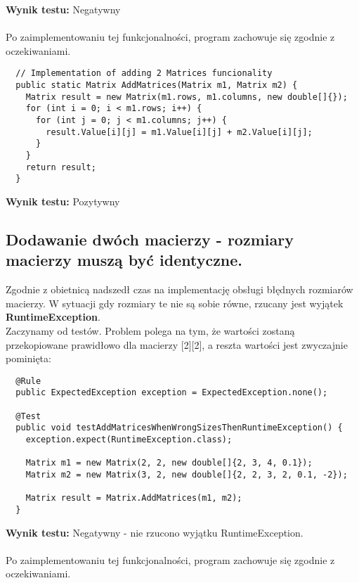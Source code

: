 \documentclass[a4paper,12pt,twoside]{article}
\begin{document}
\noindent
\textbf{Wynik testu: }{\color{red} Negatywny}\\\\
Po zaimplementowaniu tej funkcjonalności, program
zachowuje się zgodnie z oczekiwaniami.\\

\begin{lstlisting}
  // Implementation of adding 2 Matrices funcionality
  public static Matrix AddMatrices(Matrix m1, Matrix m2) {
    Matrix result = new Matrix(m1.rows, m1.columns, new double[]{});
    for (int i = 0; i < m1.rows; i++) {
      for (int j = 0; j < m1.columns; j++) {
        result.Value[i][j] = m1.Value[i][j] + m2.Value[i][j];
      }
    }
    return result;
  }
\end{lstlisting}
\medskip

\noindent
\textbf{Wynik testu: }{\color{green} Pozytywny}


\subsection{Dodawanie dwóch macierzy - rozmiary macierzy muszą być identyczne.}
\bigskip

Zgodnie z obietnicą nadszedł czas na implementację obsługi błędnych rozmiarów macierzy.
W sytuacji gdy rozmiary te nie są sobie równe, rzucany jest wyjątek \textbf{RuntimeException}.\\

\noindent
Zaczynamy od testów. Problem polega na tym, że wartości zostaną przekopiowane prawidłowo dla
macierzy [2][2], a reszta wartości jest zwyczajnie pominięta:\\

\begin{lstlisting}
  @Rule
  public ExpectedException exception = ExpectedException.none();

  @Test
  public void testAddMatricesWhenWrongSizesThenRuntimeException() {
    exception.expect(RuntimeException.class);

    Matrix m1 = new Matrix(2, 2, new double[]{2, 3, 4, 0.1});
    Matrix m2 = new Matrix(3, 2, new double[]{2, 2, 3, 2, 0.1, -2});

    Matrix result = Matrix.AddMatrices(m1, m2);
  }
\end{lstlisting}
\medskip
\noindent
\textbf{Wynik testu: }{\color{red} Negatywny - nie rzucono wyjątku RuntimeException.}\\\\
Po zaimplementowaniu tej funkcjonalności, program
zachowuje się zgodnie z oczekiwaniami.\\
\end{document}
